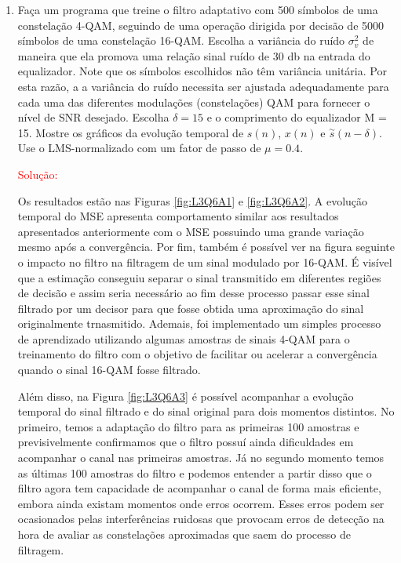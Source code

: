\begin{enumerate}
    
    \item Faça um programa que treine o ﬁltro adaptativo com 500 símbolos de uma constelação 4-QAM, seguindo de uma operação dirigida por decisão de 5000 símbolos de uma constelação 16-QAM. Escolha a variância do ruído $\sigma^{2}_{v}$ de maneira que ela promova uma relação sinal ruído de 30 db na entrada do equalizador. Note que os símbolos escolhidos não têm variância unitária. Por esta razão, a a variância do ruído necessita ser ajustada adequadamente para cada uma das diferentes modulações (constelações) QAM para fornecer o nível de SNR desejado. Escolha $\delta = 15$ e o comprimento do equalizador M = 15. Mostre os gráﬁcos da evolução temporal de $s(n)$, $x(n)$ e $\overset{\sim}{s}(n - \delta)$. Use o LMS-normalizado com um fator de passo de $\mu = 0.4$.
                
        \textcolor{red}{Solução:}

        Os resultados estão nas Figuras \ref{fig:L3Q6A1} e \ref{fig:L3Q6A2}. A evolução temporal do MSE apresenta comportamento similar aos resultados apresentados anteriormente com
        o MSE possuindo uma grande variação mesmo após a convergência. Por fim, também é possível ver na figura seguinte o impacto no filtro na filtragem de um sinal modulado por 16-QAM. É visível 
        que a estimação conseguiu separar o sinal transmitido em diferentes regiões de decisão e assim seria necessário ao fim desse processo passar esse sinal filtrado por um decisor para que fosse
        obtida uma aproximação do sinal originalmente trnasmitido. Ademais, foi implementado um simples processo de aprendizado utilizando algumas amostras de sinais 4-QAM para o treinamento do filtro com
        o objetivo de facilitar ou acelerar a convergência quando o sinal 16-QAM fosse filtrado. 
        
        Além disso, na Figura \ref{fig:L3Q6A3} é possível acompanhar a evolução temporal do sinal filtrado e do sinal 
        original para dois momentos distintos. No primeiro, temos a adaptação do filtro para as primeiras 100 amostras e previsivelmente confirmamos que o filtro possuí ainda dificuldades em acompanhar o canal 
        nas primeiras amostras. Já no segundo momento temos as últimas 100 amostras do filtro e podemos entender a partir disso que o filtro agora tem capacidade de acompanhar o canal de forma mais eficiente, embora
        ainda existam momentos onde erros ocorrem. Esses erros podem ser ocasionados pelas interferências ruidosas que provocam erros de detecção na hora de avaliar as constelações aproximadas que saem do processo de filtragem.


\end{enumerate}
